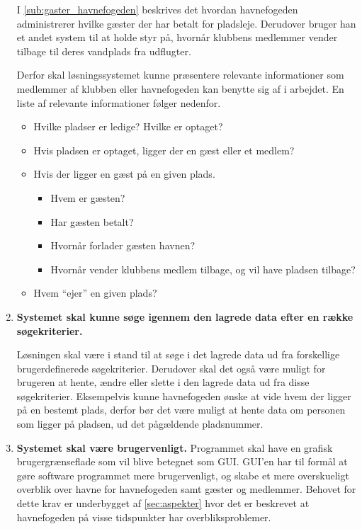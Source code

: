 \begin{enumerate}
  I \cref{sub:gaster_havnefogeden} beskrives det hvordan havnefogeden administrerer hvilke gæster der har betalt for pladsleje. Derudover bruger han et andet system til at holde styr på, hvornår klubbens medlemmer vender tilbage til deres vandplads fra udflugter.

  Derfor skal løsningssystemet kunne præsentere relevante informationer som medlemmer af klubben eller havnefogeden kan benytte sig af i arbejdet. En liste af relevante informationer følger nedenfor.

  \begin{itemize}
  \item Hvilke pladser er ledige? Hvilke er optaget?
  \item Hvis pladsen er optaget, ligger der en gæst eller et medlem?
  \item Hvis der ligger en gæst på en given plads.
    \begin{itemize}
      \item Hvem er gæsten?
      \item Har gæsten betalt?
      \item Hvornår forlader gæsten havnen?
      \item Hvornår vender klubbens medlem tilbage, og vil have pladsen tilbage?
    \end{itemize}
  \item Hvem \enquote{ejer} en given plads?
  \end{itemize}

\item \label{itm:soege} \textbf{Systemet skal kunne søge igennem den lagrede data efter en række søgekriterier.}

  Løsningen skal være i stand til at søge i det lagrede data ud fra forskellige brugerdefinerede søgekriterier. Derudover skal det også være muligt for brugeren at hente, ændre eller slette i den lagrede data ud fra disse søgekriterier. Eksempelvis kunne havnefogeden ønske at vide hvem der ligger på en bestemt plads, derfor bør det være muligt at hente data om personen som ligger på pladsen, ud det pågældende pladsnummer.
  
\item \label{itm:gui} \textbf{Systemet skal være brugervenligt.}  
    Programmet skal have en grafisk brugergrænseflade som vil blive betegnet som GUI. GUI'en har til formål at gøre software programmet mere brugervenligt, og skabe et mere overskueligt overblik over havne for havnefogeden samt gæster og medlemmer. Behovet for dette krav er underbygget af \cref{sec:aspekter} hvor det er beskrevet at havnefogeden på visse tidspunkter har overbliksproblemer.


\end{enumerate}
